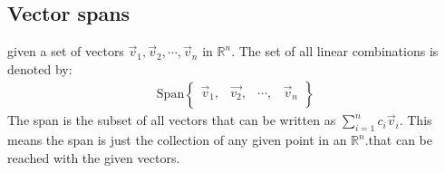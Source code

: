 \documentclass[11pt, a4paper]{article}
\begin{document}
\subsection{Vector spans}
given a set of vectors $\vec{v}_1, \vec{v}_2,\cdots, \vec{v}_n$ in $\mathbb{R}^n$.
The set of all linear combinations is denoted by:
\begin{align*}
    \text{Span} 
    \begin{Bmatrix}
        \vec{v}_1, &\vec{v_2}, & \cdots, & \vec{v}_n \\
    \end{Bmatrix}
\end{align*}
The span is the subset of all vectors that can be written as $\sum_{i=1}^{n} c_i\vec{v}_i$. This means the span
is just the collection of any given point in an  $\mathbb{R}^n$.that can be reached with the given vectors.
\end{document}
